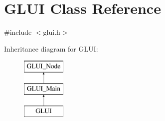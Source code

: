 \hypertarget{classGLUI}{\section{G\-L\-U\-I Class Reference}
\label{classGLUI}
}


{\ttfamily \#include $<$glui.\-h$>$}

Inheritance diagram for G\-L\-U\-I\-:\begin{figure}[H]
\begin{center}
\leavevmode
\includegraphics[height=3.000000cm]{classGLUI}
\end{center}
\end{figure}
